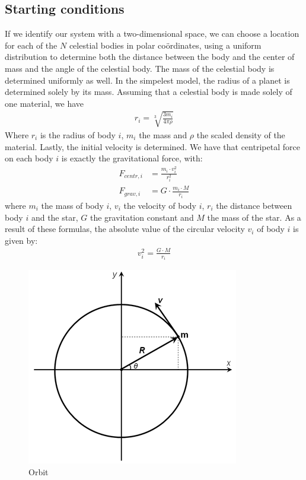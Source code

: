 \subsection{Starting conditions}
If we identify our system with a two-dimensional space, we can choose a location for each of the \(N\) celestial bodies in polar co\"ordinates, using a uniform distribution to determine both the distance between the body and the center of mass and the angle of the celestial body. 
The mass of the celestial body is determined uniformly as well. In the simpelest model, the radius of a planet is determined solely by its mass. Assuming that a celestial body is made solely of one material, we have
\begin{align}
r_i=\sqrt[3]{\frac{3 m_i}{4\pi \rho}}\label{eq:rad}
\end{align}
Where \(r_i\) is the radius of body \(i\), \(m_i\) the mass and \(\rho\) the scaled density of the material.
Lastly, the initial velocity is determined. We have that centripetal force on each body $i$ is exactly the gravitational force, with:
\begin{align*}
F_{centr,i} &= \frac{m_i\cdot v_i^2}{r_i^2}\\
F_{grav, i} &= G\cdot \frac{m_i\cdot M}{r_i}
\end{align*}
where $m_i$ the mass of body $i$, $v_i$ the velocity of body $i$, $r_i$ the distance between body $i$ and the star, $G$ the gravitation constant and $M$ the mass of the star.
As a result of these formulas, the absolute value of the circular velocity $v_i$ of body $i$ is given by:
\begin{align*} 
v_i^2 = \frac{G\cdot M}{r_i}
\end{align*}

\begin{figure}
\vspace{-30pt}
\includegraphics[scale=0.4]{cirkelbaan.png}
\caption{Orbit}
    \label{fig:cirkelbaan}
\end{figure}

